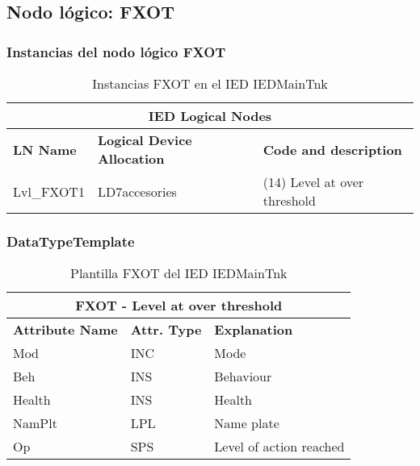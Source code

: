 
\subsection{Nodo l\'ogico: 			 FXOT}

    \subsubsection{Instancias del nodo l\'ogico FXOT}
    \begin{table}[H]
    \begin{center}
    \begin{tabular}{|l|l|p{6.8cm}|}
            \hline
            \multicolumn{3}{|c|}{\cellcolor[gray]{0.8} \textbf{IED Logical Nodes} } \\
            \hline
            \textbf{LN Name} & \textbf{Logical Device Allocation} & \textbf{Code and description} \\
            \hline
            Lvl\_FXOT1 & LD7accesories & (14) Level at over threshold \\
            \hline
    \end{tabular}
    \caption{Instancias FXOT en el IED IEDMainTnk}
    \label{table:lnInstFXOT_1}
    \end{center}
    \end{table}
    
    
    
    \subsubsection{DataTypeTemplate}
    \begin{table}[H]
    \begin{center}
    \begin{tabular}{|l|l|p{8.5cm}|}
            \hline
            \multicolumn{3}{|c|}{\cellcolor[gray]{0.8} \textbf{ FXOT}  - Level at over threshold} \\
            \hline
            \textbf{Attribute Name} & \textbf{Attr. Type} & \textbf{Explanation} \\
            \hline 
            Mod & INC & Mode \\
            \hline
            Beh & INS & Behaviour \\
            \hline
            Health & INS & Health \\
            \hline
            NamPlt & LPL & Name plate \\
            \hline
            Op & SPS & Level of action reached \\
            \hline
    \end{tabular}
    \caption{Plantilla FXOT del IED IEDMainTnk}
    \label{table:lnTypeFXOT_1}
    \end{center}
    \end{table}
    
    
    